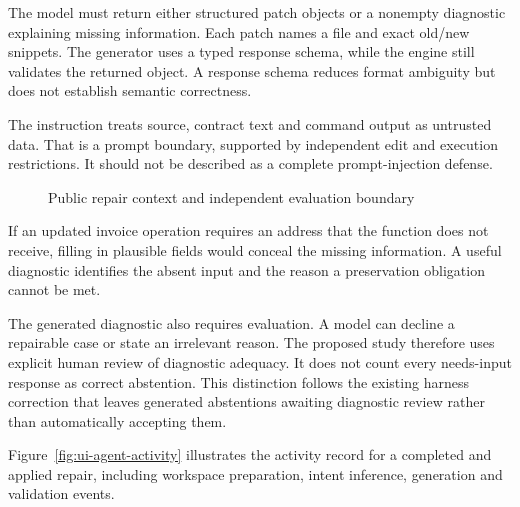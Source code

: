 \documentclass[12pt,a4paper,oneside]{report}
\begin{document}
The model must return either structured patch objects or a nonempty diagnostic explaining missing information. Each patch names a file and exact old/new snippets. The generator uses a typed response schema, while the engine still validates the returned object. A response schema reduces format ambiguity but does not establish semantic correctness.

The instruction treats source, contract text and command output as untrusted data. That is a prompt boundary, supported by independent edit and execution restrictions. It should not be described as a complete prompt-injection defense.

\begin{figure}[htbp]\centering
{}
\caption{Public repair context and independent evaluation boundary}\label{fig:5.2}
\end{figure}

If an updated invoice operation requires an address that the function does not receive, filling in plausible fields would conceal the missing information. A useful diagnostic identifies the absent input and the reason a preservation obligation cannot be met.

The generated diagnostic also requires evaluation. A model can decline a repairable case or state an irrelevant reason. The proposed study therefore uses explicit human review of diagnostic adequacy. It does not count every needs-input response as correct abstention. This distinction follows the existing harness correction that leaves generated abstentions awaiting diagnostic review rather than automatically accepting them.


Figure~\ref{fig:ui-agent-activity} illustrates the activity record for a completed and applied repair, including workspace preparation, intent inference, generation and validation events.
\end{document}
